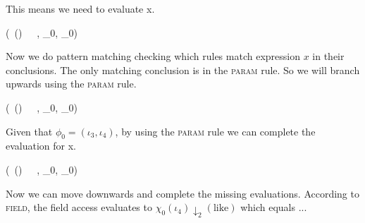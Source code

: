 This means we need to evaluate x.

{
( \,()\,  \,  \, 
, \phi_0, \chi_0)
\leadsto
\dotsm
}

\frmrule

Now we do pattern matching checking which 
rules match expression $x$ in their conclusions.
The only matching conclusion is in the \textsc{param} rule.
So we will branch upwards using the \textsc{param} rule.

{
( \,()\,  \,  \, 
, \phi_0, \chi_0)
\leadsto
\dotsm
}

Given that $\phi_0 = (\iota_3, \iota_4)$,
by using the \textsc{param} rule we can
complete the evaluation for x.

{
( \,()\,  \,  \, 
, \phi_0, \chi_0)
\leadsto
\dotsm
}

\frmrule

Now we can move downwards and complete the missing evaluations. 
According to \textsc{field}, the field access evaluates to 
$\chi_0(\iota_4) \downarrow_{2} (\text{like})$ which equals ...


